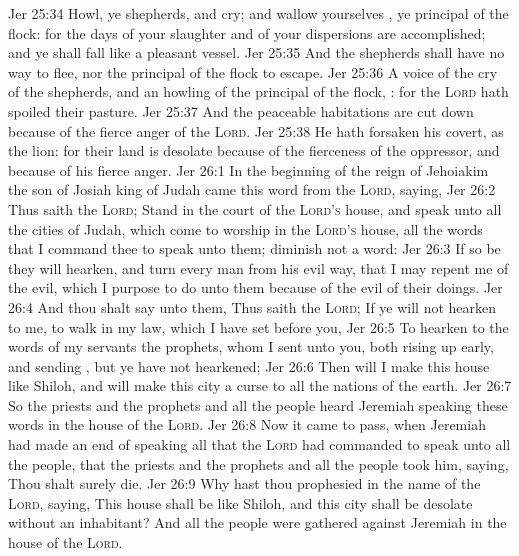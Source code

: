 \vs Jer 25:34 Howl, ye shepherds, and cry; and wallow yourselves , ye principal of the flock: for the days of your slaughter and of your dispersions are accomplished; and ye shall fall like a pleasant vessel.
\vs Jer 25:35 And the shepherds shall have no way to flee, nor the principal of the flock to escape.
\vs Jer 25:36 A voice of the cry of the shepherds, and an howling of the principal of the flock, : for the \textsc{Lord} hath spoiled their pasture.
\vs Jer 25:37 And the peaceable habitations are cut down because of the fierce anger of the \textsc{Lord}.
\vs Jer 25:38 He hath forsaken his covert, as the lion: for their land is desolate because of the fierceness of the oppressor, and because of his fierce anger.
\vs Jer 26:1 In the beginning of the reign of Jehoiakim the son of Josiah king of Judah came this word from the \textsc{Lord}, saying,
\vs Jer 26:2 Thus saith the \textsc{Lord}; Stand in the court of the \textsc{Lord's} house, and speak unto all the cities of Judah, which come to worship in the \textsc{Lord's} house, all the words that I command thee to speak unto them; diminish not a word:
\vs Jer 26:3 If so be they will hearken, and turn every man from his evil way, that I may repent me of the evil, which I purpose to do unto them because of the evil of their doings.
\vs Jer 26:4 And thou shalt say unto them, Thus saith the \textsc{Lord}; If ye will not hearken to me, to walk in my law, which I have set before you,
\vs Jer 26:5 To hearken to the words of my servants the prophets, whom I sent unto you, both rising up early, and sending , but ye have not hearkened;
\vs Jer 26:6 Then will I make this house like Shiloh, and will make this city a curse to all the nations of the earth.
\vs Jer 26:7 So the priests and the prophets and all the people heard Jeremiah speaking these words in the house of the \textsc{Lord}.
\vs Jer 26:8 Now it came to pass, when Jeremiah had made an end of speaking all that the \textsc{Lord} had commanded  to speak unto all the people, that the priests and the prophets and all the people took him, saying, Thou shalt surely die.
\vs Jer 26:9 Why hast thou prophesied in the name of the \textsc{Lord}, saying, This house shall be like Shiloh, and this city shall be desolate without an inhabitant? And all the people were gathered against Jeremiah in the house of the \textsc{Lord}.
